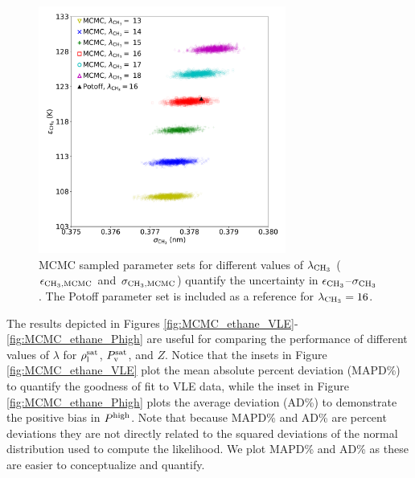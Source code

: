 \documentclass[preprint,letterpaper,floatfix,citeautoscript,aip,jcp]{revtex4-1}
\begin{document}
\begin{figure}[htb!]
	\centering
	\includegraphics[width=3.2in]{MCMC_ethane_parameter_space}
	\caption{MCMC sampled parameter sets for different values of $\lambda_{\rm CH_3}$ ($\epsilon_{\rm CH_3, MCMC}$ and $\sigma_{\rm CH_3, MCMC}$) quantify the uncertainty in $\epsilon_{\rm CH_3}$--$\sigma_{\rm CH_3}$. The Potoff parameter set is included as a reference for $\lambda_{\rm CH_3} = 16$.} 
	\label{fig:MCMC_ethane_parameter_space}
\end{figure}

The results depicted in Figures \ref{fig:MCMC_ethane_VLE}-\ref{fig:MCMC_ethane_Phigh} are useful for comparing the performance of different values of $\lambda$ for $\rho_{\rm l}^{\rm sat}$, $P_{\rm v}^{\rm sat}$, and $Z$. Notice that the insets in Figure \ref{fig:MCMC_ethane_VLE} plot the mean absolute percent deviation (MAPD\%) to quantify the goodness of fit to VLE data, while the inset in Figure \ref{fig:MCMC_ethane_Phigh} plots the average deviation (AD\%) to demonstrate the positive bias in $P^{\rm high}$. Note that because MAPD\% and AD\% are percent deviations they are not directly related to the squared deviations of the normal distribution used to compute the likelihood. We plot MAPD\% and AD\% as these are easier to conceptualize and quantify. 
\end{document}
